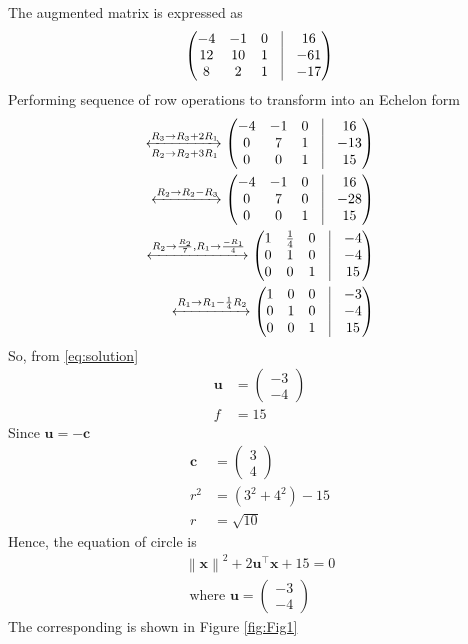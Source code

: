 \documentclass[12pt]{article}
\providecommand{\brak}[1]{\ensuremath{\left(#1\right)}}
\providecommand{\norm}[1]{\left\lVert#1\right\rVert}
\newcommand{\myvec}[1]{\ensuremath{\begin{pmatrix}#1\end{pmatrix}}}
\let\vec\mathbf
\begin{document}
The augmented matrix is expressed as
\begin{align}
	\myvec{-4 & -1 & 0 & \vrule & 16\\
	       12 & 10 & 1 & \vrule & -61\\
	        8 &  2 & 1 & \vrule & -17}
\end{align}
Performing sequence of row operations to transform into an Echelon form
\begin{align}
	\xleftrightarrow[R_2\rightarrow R_2+3R_1]{{R_3\rightarrow R_3+2R_1}}
	\myvec{-4 & -1 & 0 & \vrule & 16\\
	        0 &  7 & 1 & \vrule & -13\\
	        0 &  0 & 1 & \vrule & 15}\\
	\xleftrightarrow[]{{R_2\rightarrow R_2-R_3}}
	\myvec{-4 & -1 & 0 & \vrule & 16\\
	        0 &  7 & 0 & \vrule & -28\\
	        0 &  0 & 1 & \vrule & 15}\\
	\xleftrightarrow[]{{R_2\rightarrow \frac{R_2}{7},R_1\rightarrow \frac{-R_1}{4}}}
	\myvec{ 1 & \frac{1}{4} & 0 & \vrule & -4\\
	        0 &  1 & 0 & \vrule & -4\\
	        0 &  0 & 1 & \vrule & 15}\\
	\label{eq:solution}	
	\xleftrightarrow[]{{R_1\rightarrow R_1-\frac{1}{4}R_2}}
	\myvec{ 1 &  0 & 0 & \vrule & -3\\
	        0 &  1 & 0 & \vrule & -4\\
	        0 &  0 & 1 & \vrule & 15}
\end{align}
So, from \eqref{eq:solution}
\begin{align}
	\vec{u} &= \myvec{-3\\-4}\\
	f &= 15 
\end{align}
Since $\vec{u} = -\vec{c}$
\begin{align}
	\vec{c} &= \myvec{3\\4}\\
	r^2 &= \brak{3^2+4^2} - 15\\
	r &= \sqrt{10}
\end{align}
Hence, the equation of circle is
\begin{align}
	\norm{\vec{x}}^2 +2\vec{u}^\top \vec{x}+15 = 0\\
	\text{ where } \vec{u} = \myvec{-3\\-4}
\end{align}
The corresponding is shown in Figure \ref{fig:Fig1}
\end{document}

